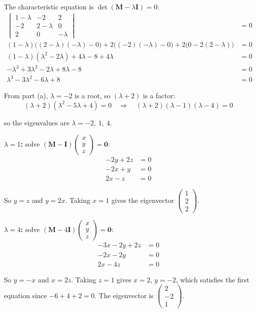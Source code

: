 \documentclass[leqno]{article}
\begin{document}
\begin{enumerate}[
  label=\textbf{\arabic*.},
  leftmargin=*,
  topsep=0pt,
  partopsep=0pt,
  parsep=0pt
]
\begin{djsSolution}
\begin{enumerate}[label=\textbf{(\alph*)}, start=1]
The characteristic equation is \(\det(\mathbf{M}-\lambda\mathbf{I})=0\):
\begin{align*}
\begin{vmatrix} 1-\lambda & -2 & 2 \\ -2 & 2-\lambda & 0 \\ 2 & 0 & -\lambda \end{vmatrix}&=0\\
(1-\lambda)\big((2-\lambda)(-\lambda)-0\big)+2\big((-2)(-\lambda)-0\big)+2\big(0-2(2-\lambda)\big)&=0\\
(1-\lambda)(\lambda^2-2\lambda)+4\lambda-8+4\lambda&=0\\
-\lambda^3+3\lambda^2-2\lambda+8\lambda-8&=0\\
\lambda^3-3\lambda^2-6\lambda+8&=0
\end{align*}

From part (a), \(\lambda=-2\) is a root, so \((\lambda+2)\) is a factor:
\[
(\lambda+2)(\lambda^2-5\lambda+4)=0\quad\Longrightarrow\quad(\lambda+2)(\lambda-1)(\lambda-4)=0
\]

so the eigenvalues are \(\lambda=-2,\ 1,\ 4\).

\textbf{\(\lambda=1\):} solve \((\mathbf{M}-\mathbf{I})\begin{pmatrix}x\\y\\z\end{pmatrix}=\mathbf{0}\):
\begin{align*}
-2y+2z&=0\\
-2x+y&=0\\
2x-z&=0
\end{align*}

So \(y=z\) and \(y=2x\). Taking \(x=1\) gives the eigenvector \(\begin{pmatrix}1\\2\\2\end{pmatrix}\).

\textbf{\(\lambda=4\):} solve \((\mathbf{M}-4\mathbf{I})\begin{pmatrix}x\\y\\z\end{pmatrix}=\mathbf{0}\):
\begin{align*}
-3x-2y+2z&=0\\
-2x-2y&=0\\
2x-4z&=0
\end{align*}

So \(y=-x\) and \(x=2z\). Taking \(z=1\) gives \(x=2\), \(y=-2\), which satisfies the first equation since \(-6+4+2=0\). The eigenvector is \(\begin{pmatrix}2\\-2\\1\end{pmatrix}\).


\end{enumerate}
\end{djsSolution}
\end{enumerate}
\end{document}
